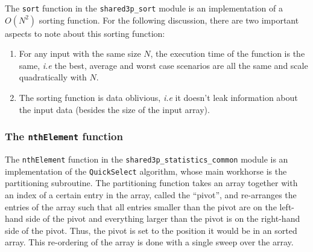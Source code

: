 \documentclass[11pt]{article}
\newcommand{\ct}[1]{\texttt{#1}}
\begin{document}
The \ct{sort} function in the \ct{shared3p\_sort} module is an implementation of a $O(N^2)$ sorting function. For the following discussion, there are two important aspects to note about this sorting function: 

\begin{enumerate}
	\item For any input with the same size $N$, the execution time of the function is the same, \emph{i.e} the best, average and worst case scenarios are all the same and scale quadratically with $N$.

	\item The sorting function is data oblivious, \emph{i.e} it doesn't leak information about the input data (besides the size of the input array).
\end{enumerate}




\subsubsection{The \ct{nthElement} function} %
\label{ssub:the_nthelement_function}

The \ct{nthElement} function in the \ct{shared3p\_statistics\_common} module is an implementation of the \ct{QuickSelect} algorithm, whose main workhorse is the partitioning subroutine. The partitioning function takes an array together with an index of a certain entry in the array, called the ``pivot'', and re-arranges the entries of the array such that all entries smaller than the pivot are on the left-hand side of the pivot and everything larger than the pivot is on the right-hand side of the pivot. Thus, the pivot is set to the position it would be in an sorted array. This re-ordering of the array is done with a single sweep over the array. 
\end{document}
